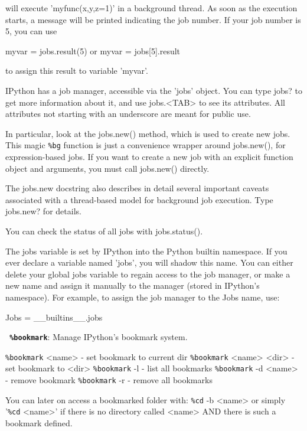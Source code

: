         will execute 'myfunc(x,y,z=1)' in a background thread.  As soon as the
        execution starts, a message will be printed indicating the job
        number.  If your job number is 5, you can use

          myvar = jobs.result(5)  or  myvar = jobs[5].result

        to assign this result to variable 'myvar'.

        IPython has a job manager, accessible via the 'jobs' object.  You can
        type jobs? to get more information about it, and use jobs.<TAB> to see
        its attributes.  All attributes not starting with an underscore are
        meant for public use.

        In particular, look at the jobs.new() method, which is used to create
        new jobs.  This magic \texttt{\%bg} function is just a convenience wrapper
        around jobs.new(), for expression-based jobs.  If you want to create a
        new job with an explicit function object and arguments, you must call
        jobs.new() directly.

        The jobs.new docstring also describes in detail several important
        caveats associated with a thread-based model for background job
        execution.  Type jobs.new? for details.

        You can check the status of all jobs with jobs.status().

        The jobs variable is set by IPython into the Python builtin namespace.
        If you ever declare a variable named 'jobs', you will shadow this
        name.  You can either delete your global jobs variable to regain
        access to the job manager, or make a new name and assign it manually
        to the manager (stored in IPython's namespace).  For example, to
        assign the job manager to the Jobs name, use:

          Jobs = \_\_builtins\_\_.jobs

\bigskip
\texttt{\textbf{ \%bookmark}}:
	Manage IPython's bookmark system.

        \texttt{\%bookmark} <name>       - set bookmark to current dir
        \texttt{\%bookmark} <name> <dir> - set bookmark to <dir>
        \texttt{\%bookmark} -l           - list all bookmarks
        \texttt{\%bookmark} -d <name>    - remove bookmark
        \texttt{\%bookmark} -r           - remove all bookmarks

        You can later on access a bookmarked folder with:
          \texttt{\%cd} -b <name>
        or simply '\texttt{\%cd} <name>' if there is no directory called <name> AND
        there is such a bookmark defined.

